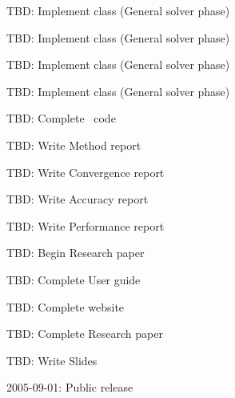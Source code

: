 \documentclass[11pt]{article}
\begin{document}
\item[TBD: ] Implement  class (General solver phase)
\item[TBD: ] Implement  class (General solver phase)
\item[TBD: ] Implement  class (General solver phase)
\item[TBD: ] Implement  class (General solver phase)
\item[TBD: ]  Complete \amrSolve\ code
\item[TBD: ] Write Method report
\item[TBD: ] Write Convergence report
\item[TBD: ] Write Accuracy report
\item[TBD: ] Write Performance report
\item[TBD: ]  Begin Research paper
\item[TBD: ]  Complete User guide
\item[TBD: ]  Complete website
\item[TBD: ]  Complete Research paper
\item[TBD: ]  Write Slides
\item[2005-09-01: ] Public release
\EndDESCRIPTION


\end{document}

